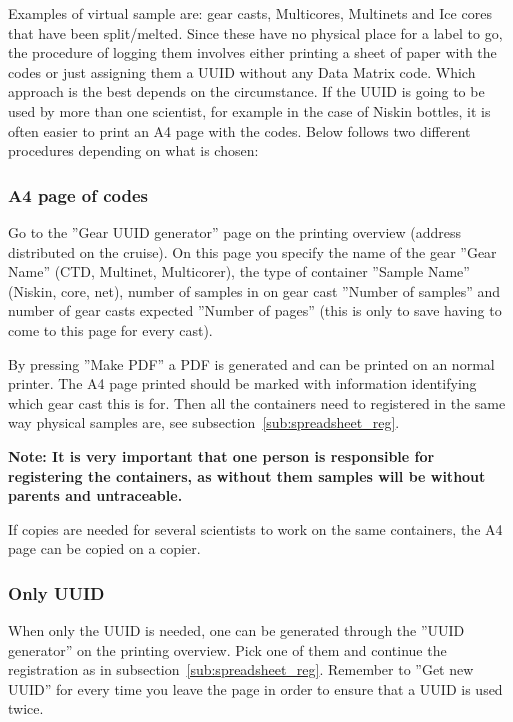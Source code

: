 \documentclass[a4paper,english, 11pt]{article}
\begin{document}
Examples of virtual sample are: gear casts, Multicores, Multinets and Ice cores that have been split/melted. Since these have no physical place for a label to go, the procedure of logging them involves either printing a sheet of paper with the codes or just assigning them a UUID without any Data Matrix code. Which approach is the best depends on the circumstance. If the UUID is going to be used by more than one scientist, for example in the case of Niskin bottles, it is often easier to print an A4 page with the codes. Below follows two different procedures depending on what is chosen:

\subsubsection{A4 page of codes} %
\label{ssub:A4_page}

Go to the ''Gear UUID generator'' page on the printing overview (address distributed on the cruise). 
On this page you specify the name of the gear ''Gear Name'' (CTD, Multinet, Multicorer), the type of container ''Sample Name'' (Niskin, core, net), number of samples in on gear cast ''Number of samples'' and number of gear casts expected ''Number of pages'' (this is only to save having to come to this page for every cast). 

By pressing ''Make PDF'' a PDF is generated and can be printed on an normal printer. The A4 page printed should be marked with information identifying which gear cast this is for. Then all the containers need to registered in the same way physical samples are, see subsection~\ref{sub:spreadsheet_reg}.

\textbf{Note: It is very important that one person is responsible for registering the containers, as without them samples will be without parents and untraceable.}

If copies are needed for several scientists to work on the same containers, the A4 page can be copied on a copier. 


\subsubsection{Only UUID} %
\label{ssub:Only_UUID}

When only the UUID is needed, one can be generated through the ''UUID generator'' on the printing overview. Pick one of them and continue the registration as in subsection~\ref{sub:spreadsheet_reg}. Remember to ''Get new UUID'' for every time you leave the page in order to ensure that a UUID is used twice.  
\end{document}
